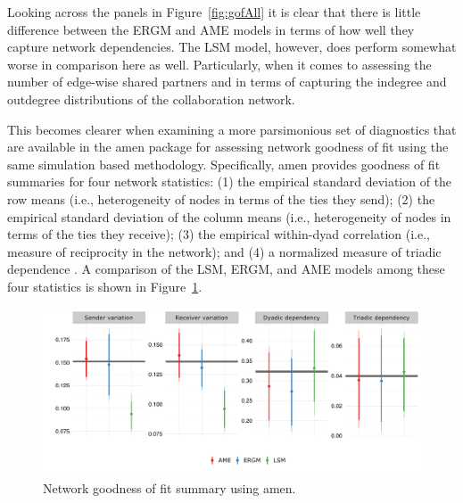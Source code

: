 \documentclass[12pt,onesided,pdflatex]{amsart}
\newcommand{\pkg}[1]{{\fontseries{b}\selectfont #1}}
\begin{document}
Looking across the panels in Figure~\ref{fig:gofAll} it is clear that there is little difference between the ERGM and AME models in terms of how well they capture network dependencies. The LSM model, however, does perform somewhat worse in comparison here as well. Particularly, when it comes to assessing the number of edge-wise shared partners and in terms of capturing the indegree and outdegree distributions of the collaboration network. 

This becomes clearer when examining a more parsimonious set of diagnostics that are available in the \pkg{amen} package for assessing network goodness of fit using the same simulation based methodology. Specifically, \pkg{amen} provides goodness of fit summaries for four network statistics: (1) the empirical standard deviation of the row means (i.e., heterogeneity of nodes in terms of the ties they send); (2) the empirical standard deviation of the column means (i.e., heterogeneity of nodes in terms of the ties they receive); (3) the empirical within-dyad correlation (i.e., measure of reciprocity in the network); and (4) a normalized measure of triadic dependence \citep{hoff:etal:2015}. A comparison of the LSM, ERGM, and AME models among these four statistics is shown in Figure~\ref{fig:ergmAmePerf}.

\begin{figure}[ht]
	\centering
	\includegraphics[width=1\textwidth]{netPerfCoef}
	\caption{Network goodness of fit summary using \pkg{amen}.}
	\label{fig:ergmAmePerf}
\end{figure}
\FloatBarrier
\end{document}
